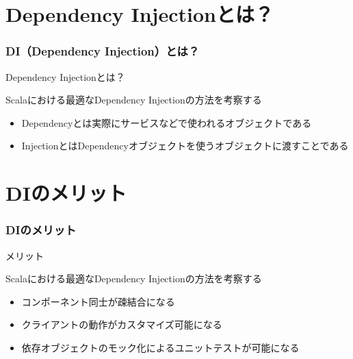 \section{Dependency Injectionとは？}

\begin{frame}
  \frametitle{DI（Dependency Injection）とは？}

  \pause

  \begin{exampleblock}{Dependency Injectionとは？}
    \begin{shadequote}[r]{\scriptsize Scalaにおける最適なDependency Injectionの方法を考察する\cite{scala-mcp}}
      \begin{itemize}
        \item Dependencyとは実際にサービスなどで使われるオブジェクトである
        \item InjectionとはDependencyオブジェクトを使うオブジェクトに渡すことである
      \end{itemize}
    \end{shadequote}
  \end{exampleblock}
\end{frame}

\section{DIのメリット}

\begin{frame}
  \frametitle{DIのメリット}

  \pause

  \begin{block}{メリット}
    \begin{shadequote}[r]{\scriptsize Scalaにおける最適なDependency Injectionの方法を考察する\cite{scala-mcp}}
      \begin{itemize}
        \item<3-> コンポーネント同士が疎結合になる
        \item<4-> クライアントの動作がカスタマイズ可能になる
        \item<5-> 依存オブジェクトのモック化によるユニットテストが可能になる
      \end{itemize}
    \end{shadequote}
  \end{block}

  \begin{center}
  \end{center}
\end{frame}


